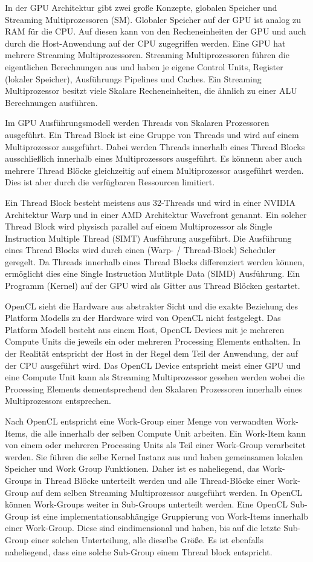 In der GPU Architektur gibt zwei große Konzepte, globalen Speicher und Streaming Multiprozessoren (SM).
Globaler Speicher auf der GPU ist analog zu RAM für die CPU.
Auf diesen kann von den Recheneinheiten der GPU und auch durch die Host-Anwendung auf der CPU zugegriffen werden. 
Eine GPU hat mehrere Streaming Multiprozessoren.
Streaming Multiprozessoren führen die eigentlichen Berechnungen aus und haben je eigene Control Units, Register (lokaler Speicher), Ausführungs Pipelines und Caches.
Ein Streaming Multiprozessor besitzt viele Skalare Recheneinheiten, die ähnlich zu einer ALU Berechnungen ausführen.

Im GPU Ausführungsmodell werden Threads von Skalaren Prozessoren ausgeführt.
Ein Thread Block ist eine Gruppe von Threads und wird auf einem Multiprozessor ausgeführt.
Dabei werden Threads innerhalb eines Thread Blocks ausschließlich innerhalb eines Multiprozessors ausgeführt.
Es könnenn aber auch mehrere Thread Blöcke gleichzeitig auf einem Multiprozessor ausgeführt werden.
Dies ist aber durch die verfügbaren Ressourcen limitiert.

Ein Thread Block besteht meistens aus 32-Threads und wird in einer NVIDIA Architektur Warp und in einer AMD Architektur Wavefront genannt.
Ein solcher Thread Block wird physisch parallel auf einem Multiprozessor als Single Instruction Multiple Thread (SIMT) Ausführung ausgeführt.
Die Ausführung eines Thread Blocks wird durch einen (Warp- / Thread-Block) Scheduler geregelt.
Da Threads innerhalb eines Thread Blocks differenziert werden können, ermöglicht dies eine Single Instruction Mutlitple Data (SIMD) Ausführung.
Ein Programm (Kernel) auf der GPU wird als Gitter aus Thread Blöcken gestartet.

OpenCL sieht die Hardware aus abstrakter Sicht und die exakte Beziehung des Platform Modells zu der Hardware wird von OpenCL nicht festgelegt.
Das Platform Modell besteht aus einem Host, OpenCL Devices mit je mehreren Compute Units die jeweils ein oder mehreren Processing Elements enthalten.
In der Realität entspricht der Host in der Regel dem Teil der Anwendung, der auf der CPU ausgeführt wird.
Das OpenCL Device entspricht meist einer GPU und eine Compute Unit kann als Streaming Multiprozessor gesehen werden wobei die Processing Elements dementsprechend den Skalaren Prozessoren innerhalb eines Multiprozessors entsprechen.

Nach OpenCL entspricht eine Work-Group einer Menge von verwandten Work-Items, die alle innerhalb der selben Compute Unit arbeiten.
Ein Work-Item kann von einem oder mehreren Processing Units als Teil einer Work-Group verarbeitet werden.
Sie führen die selbe Kernel Instanz aus und haben gemeinsamen lokalen Speicher und Work Group Funktionen.
Daher ist es naheliegend, das Work-Groups in Thread Blöcke unterteilt werden und alle Thread-Blöcke einer Work-Group auf dem selben Streaming Multiprozessor ausgeführt werden.
In OpenCL können Work-Groups weiter in Sub-Groups unterteilt werden.
Eine OpenCL Sub-Group ist eine implementationsabhängige Gruppierung von Work-Items innerhalb einer Work-Group.
Diese sind eindimensional und haben, bis auf die letzte Sub-Group einer solchen Unterteilung, alle dieselbe Größe.
Es ist ebenfalls naheliegend, dass eine solche Sub-Group einem Thread block entspricht.

